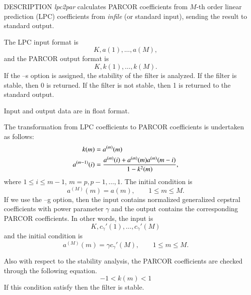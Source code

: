 \begin{synopsis}
\item [lpc2par] [ --m $M$ ] [ --g $G$ ] [ --s ] [ {\em infile} ] 
\end{synopsis}

\begin{qsection}{DESCRIPTION}
{\em lpc2par} calculates PARCOR coefficients 
from $M$-th order linear prediction (LPC) coefficients 
from {\em infile} (or standard input), 
sending the result to standard output.

The LPC input format is
\begin{displaymath}
  K, a(1),\dots, a(M), 
\end{displaymath}
and the PARCOR output format is
\begin{displaymath}
  K, k(1),\dots, k(M).
\end{displaymath}
If the --s option is assigned, the stability of the filter is analyzed.
If the filter is stable, then 0 is returned.
If the filter is not stable, then 1 is returned to the standard output.
\par
Input and output data are in float format.
\par
The transformation from LPC coefficients to PARCOR coefficients
is undertaken as follows:
\begin{align} 
k(m) &= a^{(m)}(m) \notag \\
a^{(m-1)}(i) &= \frac{a^{(m)}(i)+a^{(m)}(m)a^{(m)}(m-i)}{1-k^2(m)}, \notag
\end{align}
where $1 \leq i \leq m-1$, $m=p, p-1, \dots, 1$.
The initial condition is
\begin{displaymath}  
a^{(M)}(m) = a(m), \qquad 1 \leq m \leq M.
\end{displaymath}
If we use the --g option, then the input contains normalized generalized
cepstral coefficients with power parameter $\gamma$
and the output contains the corresponding PARCOR coefficients.
In other words, the input is 
\begin{displaymath}
K,c_\gamma'(1),\dots,c_\gamma'(M)
\end{displaymath}
and the initial condition is
\begin{displaymath}
a^{(M)}(m) = \gamma c_\gamma'(M), \qquad 1 \leq m \leq M.
\end{displaymath}

Also with respect to the stability analysis,
the PARCOR coefficients are checked through the following equation.
\begin{displaymath}
-1 < k(m) < 1
\end{displaymath}
If this condition satisfy then the filter is stable.

\end{qsection}

